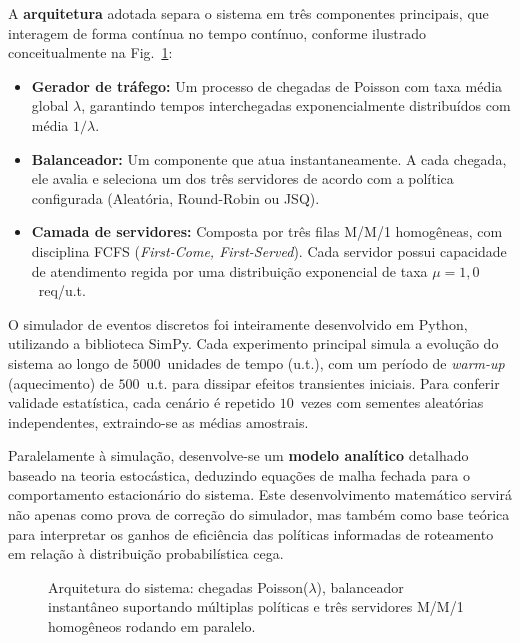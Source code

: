 \documentclass[conference]{IEEEtran}
\begin{document}
A \textbf{arquitetura} adotada separa o sistema em três componentes principais, que interagem de forma contínua no tempo contínuo, conforme ilustrado conceitualmente na Fig.~\ref{fig:arquitetura}:

\begin{itemize}
    \item \textbf{Gerador de tráfego:} Um processo de chegadas de Poisson com taxa média global $\lambda$, garantindo tempos interchegadas exponencialmente distribuídos com média $1/\lambda$.
    \item \textbf{Balanceador:} Um componente que atua instantaneamente. A cada chegada, ele avalia e seleciona um dos três servidores de acordo com a política configurada (Aleatória, Round-Robin ou JSQ).
    \item \textbf{Camada de servidores:} Composta por três filas M/M/1 homogêneas, com disciplina FCFS (\textit{First-Come, First-Served}). Cada servidor possui capacidade de atendimento regida por uma distribuição exponencial de taxa $\mu = 1{,}0$~req/u.t.
\end{itemize}

O simulador de eventos discretos foi inteiramente desenvolvido em Python, utilizando a biblioteca SimPy. Cada experimento principal simula a evolução do sistema ao longo de $5000$~unidades de tempo (u.t.), com um período de \textit{warm-up} (aquecimento) de $500$~u.t. para dissipar efeitos transientes iniciais. Para conferir validade estatística, cada cenário é repetido $10$~vezes com sementes aleatórias independentes, extraindo-se as médias amostrais. 

Paralelamente à simulação, desenvolve-se um \textbf{modelo analítico} detalhado baseado na teoria estocástica, deduzindo equações de malha fechada para o comportamento estacionário do sistema. Este desenvolvimento matemático servirá não apenas como prova de correção do simulador, mas também como base teórica para interpretar os ganhos de eficiência das políticas informadas de roteamento em relação à distribuição probabilística cega.

\begin{figure}[!t]
\centering
{}
\caption{Arquitetura do sistema: chegadas Poisson($\lambda$), balanceador instantâneo suportando múltiplas políticas e três servidores M/M/1 homogêneos rodando em paralelo.}
\label{fig:arquitetura}
\end{figure}
\end{document}
